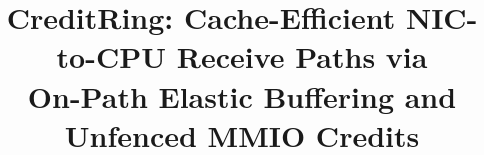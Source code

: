 \documentclass[letterpaper,twocolumn,10pt]{article}
\begin{document}
\date{}

\title{\Large \bf CreditRing: Cache-Efficient NIC-to-CPU Receive Paths via\\
On-Path Elastic Buffering and Unfenced MMIO Credits}

\author{}

\maketitle











{\footnotesize\linespread{0.95}\selectfont
\let\oldthebibliography\thebibliography
\renewcommand{\thebibliography}[1]{\oldthebibliography{#1}\setlength{\itemsep}{0.5pt plus 0.2pt}\setlength{\parsep}{0pt}\setlength{\parskip}{0pt}}


}
\end{document}
